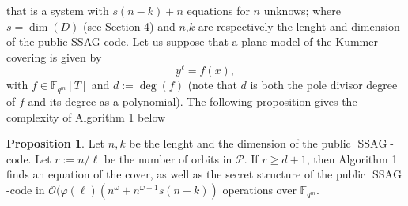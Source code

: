 \documentclass[10pt]{article}
\theoremstyle{definition}
\newtheorem{prop1}[thm]{Proposition}
\theoremstyle{definition}
\theoremstyle{definition}
\newcommand{\s}{\vspace{0.3cm}}
\newcommand{\calO}{\mathcal{O}}
\newcommand{\fqm}{\mathbb{F}_{q^m}}
\newcommand{\w}{\omega}
\newcommand{\PR}{\mathcal{P}}
\newcommand{\ssag}{\operatorname{SSAG}}
\begin{document}
that is a system with $s(n-k)+n$ equations for $n$ unknows; where $s=\dim(D)$ (see Section 4) and $n$,$k$ are respectively the lenght and dimension of the public SSAG-code. Let us suppose that a plane model of the Kummer covering is given by 
\[y^{\ell} = f(x),\]
with $f \in \fqm[T]$ and \color{purple} $d:=\deg(f)$ (note that $d$ is both the pole divisor degree of $f$ and its degree as a polynomial). \color{black}
The following proposition gives the complexity of Algorithm 1 below

\s

\begin{prop1} Let $n,k$ be the lenght and the dimension of the public $\ssag$-code. Let $r := n/\ell$ be the number of orbits in $\PR$. If $r \geq d+1$, then Algorithm 1 finds an equation of the cover, as well as the secret structure of the public $\ssag$-code in $\calO(\varphi(\ell)(n^{\w}+n^{\w-1}s(n-k))$ operations over $\fqm$. 

\end{prop1}

\s
\end{document}
